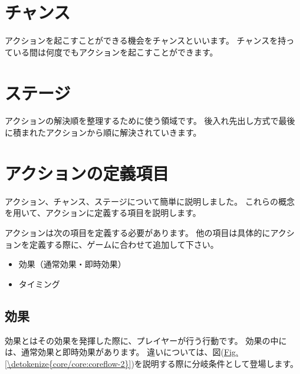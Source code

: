 \documentclass[letterpaper,10pt,dvipdfmx]{sphinxmanual}
\begin{document}
\section{チャンス}
\label{\detokenize{core/core:id4}}
アクションを起こすことができる機会をチャンスといいます。
チャンスを持っている間は何度でもアクションを起こすことができます。


\section{ステージ}
\label{\detokenize{core/core:id5}}
アクションの解決順を整理するために使う領域です。
後入れ先出し方式で最後に積まれたアクションから順に解決されていきます。


\section{アクションの定義項目}
\label{\detokenize{core/core:id6}}
アクション、チャンス、ステージについて簡単に説明しました。
これらの概念を用いて、アクションに定義する項目を説明します。

アクションは次の項目を定義する必要があります。
他の項目は具体的にアクションを定義する際に、ゲームに合わせて追加して下さい。
\begin{itemize}
\item {} 
効果（通常効果・即時効果）

\item {} 
タイミング

\end{itemize}


\subsection{効果}
\label{\detokenize{core/core:id7}}
効果とはその効果を発揮した際に、プレイヤーが行う行動です。
効果の中には、通常効果と即時効果があります。
違いについては、図(\hyperref[\detokenize{core/core:coreflow-2}]{Fig.\@ \ref{\detokenize{core/core:coreflow-2}}})を説明する際に分岐条件として登場します。
\end{document}
